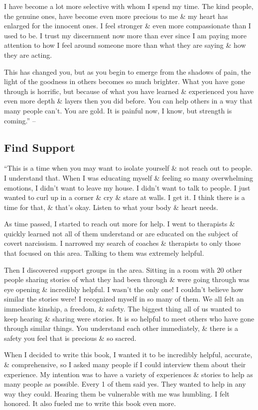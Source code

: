 \documentclass{article}
\numberwithin{equation}{section}
\begin{document}
I have become a lot more selective with whom I spend my time. The kind people, the genuine ones, have become even more precious to me \& my heart has enlarged for the innocent ones. I feel stronger \& even more compassionate than I used to be. I trust my discernment now more than ever since I am paying more attention to how I feel around someone more than what they are saying \& how they are acting.

This has changed you, but as you begin to emerge from the shadows of pain, the light of the goodness in others becomes so much brighter. What you have gone through is horrific, but because of what you have learned \& experienced you have even more depth \& layers then you did before. You can help others in a way that many people can't. You are gold. It is painful now, I know, but strength is coming.'' -- \cite[pp. 163--165]{Mirza2017}

\subsection{Find Support}
``This is a time when you may want to isolate yourself \& not reach out to people. I understand that. When I was educating myself \& feeling so many overwhelming emotions, I didn't want to leave my house. I didn't want to talk to people. I just wanted to curl up in a corner \& cry \& stare at walls. I get it. I think there is a time for that, \& that's okay. Listen to what your body \& heart needs.

As time passed, I started to reach out more for help. I went to therapists \& quickly learned not all of them understand or are educated on the subject of covert narcissism. I narrowed my search of coaches \& therapists to only those that focused on this area. Talking to them was extremely helpful.

Then I discovered support groups in the area. Sitting in a room with 20 other people sharing stories of what they had been through \& were going through was eye opening \& incredibly helpful. I wasn't the only one! I couldn't believe how similar the stories were! I recognized myself in so many of them. We all felt an immediate kinship, a freedom, \& safety. The biggest thing all of us wanted to keep hearing \& sharing were stories. It is so helpful to meet others who have gone through similar things. You understand each other immediately, \& there is a safety you feel that is precious \& so sacred.

When I decided to write this book, I wanted it to be incredibly helpful, accurate, \& comprehensive, so I asked many people if I could interview them about their experience. My intention was to have a variety of experiences \& stories to help as many people as possible. Every 1 of them said yes. They wanted to help in any way they could. Hearing them be vulnerable with me was humbling. I felt honored. It also fueled me to write this book even more.
\end{document}
